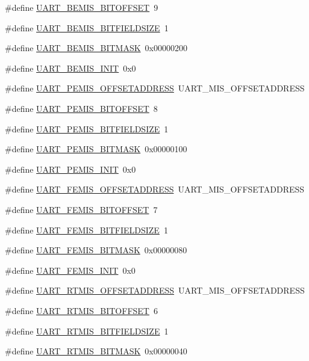 \begin{DoxyCompactItemize}
\item 
\#define \hyperlink{a00575_ab355d117d95b79f20c5aa09c241f5324}{UART\_\-BEMIS\_\-BITOFFSET}~9
\item 
\#define \hyperlink{a00575_a55f9594f11a7cb606fae22ca0eff2d71}{UART\_\-BEMIS\_\-BITFIELDSIZE}~1
\item 
\#define \hyperlink{a00575_a5025e843e5b7edac1305bc6a9abaca6f}{UART\_\-BEMIS\_\-BITMASK}~0x00000200
\item 
\#define \hyperlink{a00575_a1732bc2890bc0dea900549fb47a1f477}{UART\_\-BEMIS\_\-INIT}~0x0
\item 
\#define \hyperlink{a00575_a5e460a81506f212bdc5d691b09a8917e}{UART\_\-PEMIS\_\-OFFSETADDRESS}~UART\_\-MIS\_\-OFFSETADDRESS
\item 
\#define \hyperlink{a00575_a3b158a3798b70b280e5970f3efea25b3}{UART\_\-PEMIS\_\-BITOFFSET}~8
\item 
\#define \hyperlink{a00575_ab9fa7f3efae8b0d4fb078ab836e692c0}{UART\_\-PEMIS\_\-BITFIELDSIZE}~1
\item 
\#define \hyperlink{a00575_aa8f1afcf892684eb3a553e6044ab09fa}{UART\_\-PEMIS\_\-BITMASK}~0x00000100
\item 
\#define \hyperlink{a00575_a3c9e69398394f1277449b7c54abdbbba}{UART\_\-PEMIS\_\-INIT}~0x0
\item 
\#define \hyperlink{a00575_ae7f2f8c2886b803aa6ac65ae0313fe2f}{UART\_\-FEMIS\_\-OFFSETADDRESS}~UART\_\-MIS\_\-OFFSETADDRESS
\item 
\#define \hyperlink{a00575_a7e2ff05f5be52dd4087cef4c9ff5ac48}{UART\_\-FEMIS\_\-BITOFFSET}~7
\item 
\#define \hyperlink{a00575_ac906fc0917a81985e74a007f3c83f98a}{UART\_\-FEMIS\_\-BITFIELDSIZE}~1
\item 
\#define \hyperlink{a00575_a7642b1290bdd2632fdbde6dc23002af1}{UART\_\-FEMIS\_\-BITMASK}~0x00000080
\item 
\#define \hyperlink{a00575_ad43bde0afddf0023acefa3180b19cc21}{UART\_\-FEMIS\_\-INIT}~0x0
\item 
\#define \hyperlink{a00575_a00d3717497e5d21385bda08216e7636f}{UART\_\-RTMIS\_\-OFFSETADDRESS}~UART\_\-MIS\_\-OFFSETADDRESS
\item 
\#define \hyperlink{a00575_a884eccca3ddb6433f85a2782a62230f3}{UART\_\-RTMIS\_\-BITOFFSET}~6
\item 
\#define \hyperlink{a00575_a9d8d6a9e39c3dcb5e8dbe5c817e44d31}{UART\_\-RTMIS\_\-BITFIELDSIZE}~1
\item 
\#define \hyperlink{a00575_a2f0ced95690044a3d39f1b79ad403982}{UART\_\-RTMIS\_\-BITMASK}~0x00000040

\end{DoxyCompactItemize}
